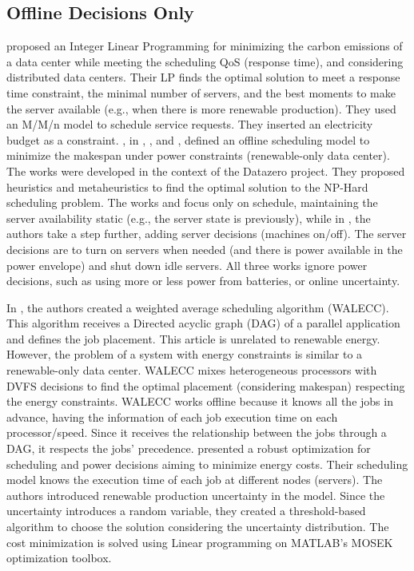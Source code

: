 \subsection{Offline Decisions Only}
\citeauthor{gu2015green} \cite{gu2015green} proposed an Integer Linear Programming for minimizing the carbon emissions of a data center while meeting the scheduling QoS (response time), and considering distributed data centers. Their LP finds the optimal solution to meet a response time constraint, the minimal number of servers, and the best moments to make the server available (e.g., when there is more renewable production). They used an M/M/n model to schedule service requests. They inserted an electricity budget as a constraint. \citeauthor{kassab2017scheduling}, in \cite{kassab2017scheduling}, \cite{kassab2018assessing}, and \cite{kassab2019green}, defined an offline scheduling model to minimize the makespan under power constraints (renewable-only data center). The works were developed in the context of the Datazero project. They proposed heuristics and metaheuristics to find the optimal solution to the NP-Hard scheduling problem. The works \cite{kassab2017scheduling} and \cite{kassab2018assessing} focus only on schedule, maintaining the server availability static (e.g., the server state is previously), while in \cite{kassab2019green}, the authors take a step further, adding server decisions (machines on/off). The server decisions are to turn on servers when needed (and there is power available in the power envelope) and shut down idle servers. All three works ignore power decisions, such as using more or less power from batteries, or online uncertainty.

In \cite{hu2018schedule}, the authors created a weighted average scheduling algorithm (WALECC). This algorithm receives a Directed acyclic graph (DAG) of a parallel application and defines the job placement. This article is unrelated to renewable energy. However, the problem of a system with energy constraints is similar to a renewable-only data center. WALECC mixes heterogeneous processors with DVFS decisions to find the optimal placement (considering makespan) respecting the energy constraints. WALECC works offline because it knows all the jobs in advance, having the information of each job execution time on each processor/speed. Since it receives the relationship between the jobs through a DAG, it respects the jobs' precedence. \citeauthor{lu2018energy} \cite{lu2018energy} presented a robust optimization for scheduling and power decisions aiming to minimize energy costs. Their scheduling model knows the execution time of each job at different nodes (servers). The authors introduced renewable production uncertainty in the model. Since the uncertainty introduces a random variable, they created a threshold-based algorithm to choose the solution considering the uncertainty distribution. The cost minimization is solved using Linear programming on MATLAB's MOSEK optimization toolbox.

